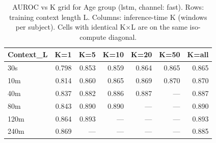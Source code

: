 \begin{table}[ht]
\centering
\caption{AUROC vs K grid for Age group (lstm, channel: fast). Rows: training context length L. Columns: inference-time K (windows per subject). Cells with identical K×L are on the same iso-compute diagonal.}
\label{tab:kgrid_age_class_lstm_fast}
\begin{tabular}{lrrrrrr}
\toprule
Context_L & K=1 & K=5 & K=10 & K=20 & K=50 & K=all \\
\midrule
30s & 0.798 & 0.853 & 0.859 & 0.864 & 0.865 & 0.865 \\
10m & 0.814 & 0.860 & 0.865 & 0.869 & 0.870 & 0.870 \\
40m & 0.837 & 0.882 & 0.886 & 0.887 & — & 0.887 \\
80m & 0.843 & 0.890 & 0.890 & — & — & 0.890 \\
120m & 0.864 & 0.893 & — & — & — & 0.893 \\
240m & 0.869 & — & — & — & — & 0.885 \\
\bottomrule
\end{tabular}
\end{table}